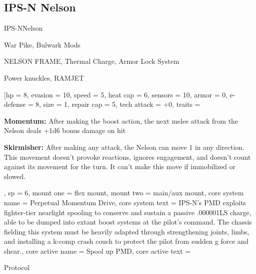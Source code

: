 \subsection{IPS-N Nelson}

\begin{mech}{IPS-N}{Nelson}


\begin{license}
\item War Pike, Bulwark Mods
\item NELSON FRAME, Thermal Charge, Armor Lock System
\item Power knuckles, RAMJET
\end{license}

\frameTable
[hp = 8,
evasion = 10,
speed = 5,
heat cap = 6,
sensors = 10,
armor = 0,
e-defense = 8,
size = 1,
repair cap = 5,
tech attack = +0,
traits = {\textbf{Momentum:} After making the boost action, the next melee attack from the Nelson deals +1d6 bonus damage on hit

\textbf{Skirmisher:} After making any attack, the Nelson can move 1 in any direction. This movement doesn’t provoke reactions, ignores engagement, and doesn’t count against its movement for the turn. It can’t make this move if immobilized or slowed.},
sp = 6,
mount one = flex mount,
mount two = main/aux mount,
core system name = Perpetual Momentum Drive,
core system text = {IPS-N’s PMD exploits fighter-tier nearlight spooling to conserve and sustain a passive .000001LS charge, able to be dumped into extant boost systems at the pilot’s command. The chassis fielding this system must be heavily adapted through strengthening joints, limbs, and installing a k-comp crash couch to protect the pilot from sudden g force and shear.},
core active name = Spool up PMD,
core active text = {Protocol

}
\end{mech}
